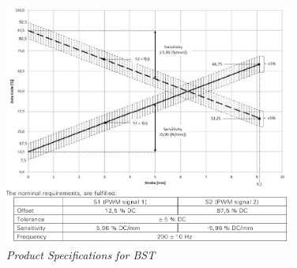 \documentclass[8pt,compress,aspectratio=169]{beamer}
\begin{document}
\begin{frame}
\begin{minipage}{0.50\textwidth}
\begin{figure}
      \includegraphics[width=0.85\textwidth]{assets/specs/bst_product_specs.png}
      \caption{\it Product Specifications for BST}
    \end{figure}
  \end{minipage}
\end{frame}
\end{document}
